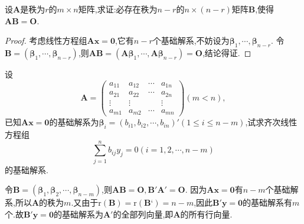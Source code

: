 \documentclass[../../main.tex]{subfiles}%
\begin{document}
\begin{proposition}\label{proposition:线性方程组的解结论1}
设\(\boldsymbol{A}\)是秩为\(r\)的\(m\times n\)矩阵,求证:必存在秩为\(n - r\)的\(n\times(n - r)\)矩阵\(\boldsymbol{B}\),使得\(\boldsymbol{A}\boldsymbol{B}=\boldsymbol{O}\).
\end{proposition}
\begin{proof}
考虑线性方程组\(\boldsymbol{A}\boldsymbol{x}=\boldsymbol{0}\),它有\(n - r\)个基础解系,不妨设为\(\boldsymbol{\beta}_1,\cdots,\boldsymbol{\beta}_{n - r}\). 令\(\boldsymbol{B}=(\boldsymbol{\beta}_1,\cdots,\boldsymbol{\beta}_{n - r})\),则\(\boldsymbol{A}\boldsymbol{B}=(\boldsymbol{A}\boldsymbol{\beta}_1,\cdots,\boldsymbol{A}\boldsymbol{\beta}_{n - r})=\boldsymbol{O}\),结论得证. 
\end{proof}

\begin{example}
设
\[
\boldsymbol{A}=\begin{pmatrix}
a_{11}&a_{12}&\cdots&a_{1n}\\
a_{21}&a_{22}&\cdots&a_{2n}\\
\vdots&\vdots&&\vdots\\
a_{m1}&a_{m2}&\cdots&a_{mn}
\end{pmatrix}(m < n),
\]
已知\(\boldsymbol{A}\boldsymbol{x}=\boldsymbol{0}\)的基础解系为\(\boldsymbol{\beta}_i=(b_{i1},b_{i2},\cdots,b_{in})'(1\leqslant  i\leqslant  n - m)\),试求齐次线性方程组
\[
\sum_{j = 1}^{n}b_{ij}y_j = 0(i = 1,2,\cdots,n - m)
\]
的基础解系.
\end{example}
\begin{solution}
令\(\boldsymbol{B}=(\boldsymbol{\beta}_1,\boldsymbol{\beta}_2,\cdots,\boldsymbol{\beta}_{n - m})\),则\(\boldsymbol{A}\boldsymbol{B}=\boldsymbol{O},\boldsymbol{B}'\boldsymbol{A}'=\boldsymbol{O}\). 因为\(\boldsymbol{A}\boldsymbol{x}=\boldsymbol{0}\)有$n-m$个基础解系,所以\(\boldsymbol{A}\)的秩为\(m\).又由于$\mathrm{r}\left( \boldsymbol{B} \right) =\mathrm{r}\left( \boldsymbol{B}‘ \right) =n-m$,因此\(\boldsymbol{B}'\boldsymbol{y}=\boldsymbol{0}\)的基础解系有$m$个.故\(\boldsymbol{B}'\boldsymbol{y}=\boldsymbol{0}\)的基础解系为\(\boldsymbol{A}'\)的全部列向量,即\(\boldsymbol{A}\)的所有行向量.

\end{solution}
\end{document}
